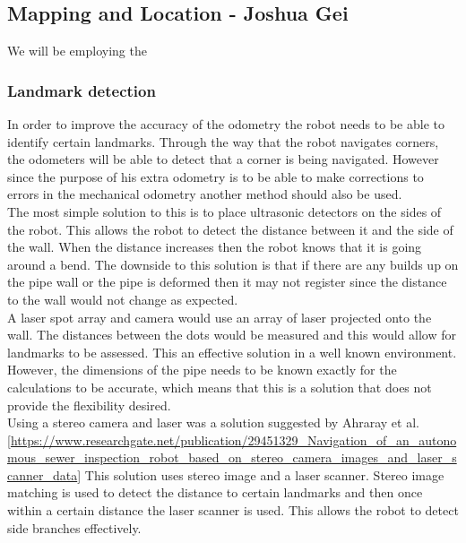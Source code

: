 \documentclass[11pt]{article}		%
\begin{document}
		\subsection{Mapping and Location - Joshua Gei}

        We will be employing the
        
        
		
		\subsubsection{Landmark detection}
        In order to improve the accuracy of the odometry the robot needs to be able to identify certain landmarks. 
        Through the way that the robot navigates corners, the odometers will be able to detect that a corner is being navigated. 
        However since the purpose of his extra odometry is to be able to make corrections to errors in the mechanical odometry another method should also be used.
        \\
        The most simple solution to this is to place ultrasonic detectors on the sides of the robot. 
        This allows the robot to detect the distance between it and the side of the wall. 
        When the distance increases then the robot knows that it is going around a bend. 
        The downside to this solution is that if there are any builds up on the pipe wall or the pipe is deformed then it may not register since the distance to the wall would not change as expected.
        \\
        A laser spot array and camera would use an array of laser projected onto the wall. 
        The distances between the dots would be measured and this would allow for landmarks to be assessed. 
        This an effective solution in a well known environment. 
        However, the dimensions of the pipe needs to be known exactly for the calculations to be accurate, which means that this is a solution that does not provide the flexibility desired.
        \\
        Using a stereo camera and laser was a solution suggested by Ahraray et al. [\url{https://www.researchgate.net/publication/29451329_Navigation_of_an_autonomous_sewer_inspection_robot_based_on_stereo_camera_images_and_laser_scanner_data}] 
        This solution uses stereo image and a laser scanner. 
        Stereo image matching is used to detect the distance to certain landmarks and then once within a certain distance the laser scanner is used. 
        This allows the robot to detect side branches effectively. 
\end{document}
